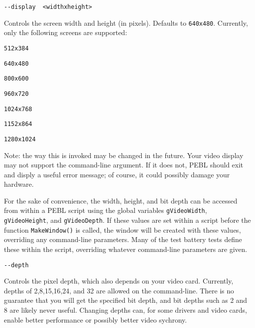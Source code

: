 \begin{description}
\item
\begin{verbatim}
--display  <widthxheight>
\end{verbatim}
  Controls the screen width and height (in pixels). Defaults
  to \texttt{640x480}.
  Currently, only the following screens are supported:
\begin{description}
\item
\begin{verbatim}
512x384
\end{verbatim}
\item
\begin{verbatim}
640x480
\end{verbatim}
\item
\begin{verbatim}
800x600
\end{verbatim}
\item
\begin{verbatim}
960x720
\end{verbatim}
\item
\begin{verbatim}
1024x768
\end{verbatim}
\item
\begin{verbatim}
1152x864
\end{verbatim}
\item
\begin{verbatim}
1280x1024
\end{verbatim}
\end{description}

Note: the way this is invoked may be changed in the
future.  Your video display may not support the
command-line argument.  If it does not, PEBL should exit
and disply a useful error message; of course, it could
possibly damage your hardware. 

For the sake of convenience, the width, height, and bit depth can be
accessed from within a PEBL script using the global variables
\texttt{gVideoWidth}, \texttt{gVideoHeight}, and \texttt{gVideoDepth}.
If these values are set within a script before the function
\verb+MakeWindow()+ is called,  the window will be created with these values,
overriding any command-line parameters.  Many of the test battery tests define these within the script,
overriding whatever command-line parameters are given.
  
\item
\begin{verbatim}
--depth
\end{verbatim}
  Controls the pixel depth, which also  depends on your video card.
  Currently, depths of 2,8,15,16,24, and 32 are allowed on the
  command-line.  There is no guarantee that you will get the
  specified bit depth, and bit depths such as 2 and 8 are
  likely never useful.  Changing depths can, for
  some drivers and video cards, enable better performance or
  possibly better video sychrony.


\end{description}
